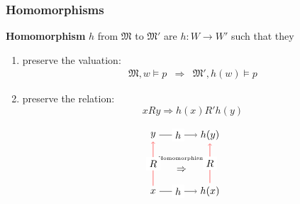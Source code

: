 \documentclass[xcolor=x11names]{beamer}
\renewcommand{\emph}[1]{\textbf{#1}}
\begin{document}

\begin{frame}
\frametitle{Homomorphisms}
\emph{Homomorphism} $h$ from $\mathfrak M$ to $\mathfrak M'$ are $h: W\to W'$ such that they
\begin{enumerate}
\item preserve the valuation:
	\[ \begin{array}{rcl} 	%
							\mathfrak M, w\models p &\Longrightarrow & \mathfrak M' , h(w) \models p \end{array}\]
\item preserve the relation:
\[ xRy \Longrightarrow h(x) R' h(y) \]
\end{enumerate}

\[ \begin{tikzpicture}[scale=2]
\node (x) at (0,0){$x$};
\node (y) at (0,1){$y$};
\node (fx) at (1,0){$h(x)$};
\node (fy) at (1,1){$h(y)$};
\node  at (.5,.5){\begin{tabular}{c}{\tiny Homomorphism} \\ $\Rightarrow$\end{tabular}};
\draw[->] (x)	--	(fx) 	node[midway, fill=white]{$h$};
\draw[->] (y)	--	(fy) 	node[midway, fill=white]{$h$};
\draw[->,red] (x)	--	(y)		node[black, midway, fill=white]{$R$};
\draw[->,red] (fx)	--	(fy)	node[black, midway, fill=white]{$R$};
\end{tikzpicture}\]
\end{frame}

\end{document}
